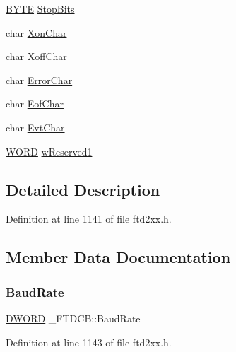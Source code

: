 \begin{DoxyCompactItemize}
\hyperlink{CatCaloProto40MHz_2inc_2WinTypes_8h_a4ae1dab0fb4b072a66584546209e7d58}{B\+Y\+TE} \hyperlink{struct__FTDCB_a26a8414df8e94f282714833f9776319a}{Stop\+Bits}
\item 
char \hyperlink{struct__FTDCB_aee3e405df31d5b168110814d5529b014}{Xon\+Char}
\item 
char \hyperlink{struct__FTDCB_a30a25a1c40525289b24b29f6593a6c51}{Xoff\+Char}
\item 
char \hyperlink{struct__FTDCB_a0b8fa24da4dcdba892abd2c6cdb55707}{Error\+Char}
\item 
char \hyperlink{struct__FTDCB_a6f0a84ef54dbc36123a40e05ba94aa4e}{Eof\+Char}
\item 
char \hyperlink{struct__FTDCB_a579b4755ad4a7ea9c76ddaf5f548a460}{Evt\+Char}
\item 
\hyperlink{CatCaloProto40MHz_2inc_2WinTypes_8h_a197942eefa7db30960ae396d68339b97}{W\+O\+RD} \hyperlink{struct__FTDCB_a6775b20a593cc63edde243ed9605a028}{w\+Reserved1}
\end{DoxyCompactItemize}


\subsection{Detailed Description}


Definition at line 1141 of file ftd2xx.\+h.



\subsection{Member Data Documentation}
\mbox{\label{struct__FTDCB_a3c59a8bdbb30e28505045b3186c89cbf}} 
\subsubsection{\texorpdfstring{Baud\+Rate}{BaudRate}}
{\footnotesize\ttfamily \hyperlink{CatCaloProto40MHz_2inc_2WinTypes_8h_ad342ac907eb044443153a22f964bf0af}{D\+W\+O\+RD} \+\_\+\+F\+T\+D\+C\+B\+::\+Baud\+Rate}



Definition at line 1143 of file ftd2xx.\+h.

\mbox{\label{struct__FTDCB_a6c3cd5d1cae69a2051d8c83badc52780}} 
